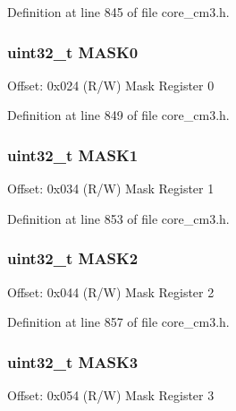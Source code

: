 Definition at line 845 of file core\+\_\+cm3.\+h.

\subsubsection[{\texorpdfstring{M\+A\+S\+K0}{MASK0}}]{ uint32\+\_\+t M\+A\+S\+K0}\hypertarget{struct_d_w_t___type_a84089e08ecf14b86f92c727a568ceac4}{}\label{struct_d_w_t___type_a84089e08ecf14b86f92c727a568ceac4}
Offset\+: 0x024 (R/W) Mask Register 0 

Definition at line 849 of file core\+\_\+cm3.\+h.

\subsubsection[{\texorpdfstring{M\+A\+S\+K1}{MASK1}}]{ uint32\+\_\+t M\+A\+S\+K1}\hypertarget{struct_d_w_t___type_a6f663226a4f3409b0a73651b5a90b3af}{}\label{struct_d_w_t___type_a6f663226a4f3409b0a73651b5a90b3af}
Offset\+: 0x034 (R/W) Mask Register 1 

Definition at line 853 of file core\+\_\+cm3.\+h.

\subsubsection[{\texorpdfstring{M\+A\+S\+K2}{MASK2}}]{ uint32\+\_\+t M\+A\+S\+K2}\hypertarget{struct_d_w_t___type_a32213bf45fbe36e1823e69028f7edef2}{}\label{struct_d_w_t___type_a32213bf45fbe36e1823e69028f7edef2}
Offset\+: 0x044 (R/W) Mask Register 2 

Definition at line 857 of file core\+\_\+cm3.\+h.

\subsubsection[{\texorpdfstring{M\+A\+S\+K3}{MASK3}}]{ uint32\+\_\+t M\+A\+S\+K3}\hypertarget{struct_d_w_t___type_a51e9ef8e2238e82f3b40aa2599397637}{}\label{struct_d_w_t___type_a51e9ef8e2238e82f3b40aa2599397637}
Offset\+: 0x054 (R/W) Mask Register 3 

